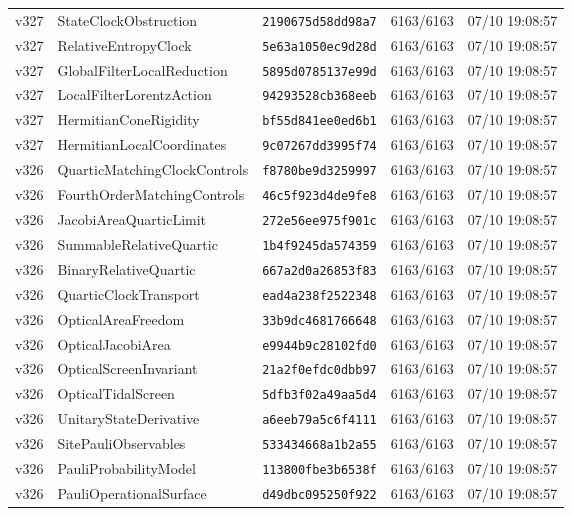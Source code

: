 \documentclass[11pt]{article}
\theoremstyle{definition}\newtheorem{deriv}{Derivation}
\begin{document}
{\begin{longtable}{@{}lllll@{}}
v327 & StateClockObstruction & \texttt{2190675d58dd98a7} & 6163/6163 & 07/10 19:08:57 \\
v327 & RelativeEntropyClock & \texttt{5e63a1050ec9d28d} & 6163/6163 & 07/10 19:08:57 \\
v327 & GlobalFilterLocalReduction & \texttt{5895d0785137e99d} & 6163/6163 & 07/10 19:08:57 \\
v327 & LocalFilterLorentzAction & \texttt{94293528cb368eeb} & 6163/6163 & 07/10 19:08:57 \\
v327 & HermitianConeRigidity & \texttt{bf55d841ee0ed6b1} & 6163/6163 & 07/10 19:08:57 \\
v327 & HermitianLocalCoordinates & \texttt{9c07267dd3995f74} & 6163/6163 & 07/10 19:08:57 \\
v326 & QuarticMatchingClockControls & \texttt{f8780be9d3259997} & 6163/6163 & 07/10 19:08:57 \\
v326 & FourthOrderMatchingControls & \texttt{46c5f923d4de9fe8} & 6163/6163 & 07/10 19:08:57 \\
v326 & JacobiAreaQuarticLimit & \texttt{272e56ee975f901c} & 6163/6163 & 07/10 19:08:57 \\
v326 & SummableRelativeQuartic & \texttt{1b4f9245da574359} & 6163/6163 & 07/10 19:08:57 \\
v326 & BinaryRelativeQuartic & \texttt{667a2d0a26853f83} & 6163/6163 & 07/10 19:08:57 \\
v326 & QuarticClockTransport & \texttt{ead4a238f2522348} & 6163/6163 & 07/10 19:08:57 \\
v326 & OpticalAreaFreedom & \texttt{33b9dc4681766648} & 6163/6163 & 07/10 19:08:57 \\
v326 & OpticalJacobiArea & \texttt{e9944b9c28102fd0} & 6163/6163 & 07/10 19:08:57 \\
v326 & OpticalScreenInvariant & \texttt{21a2f0efdc0dbb97} & 6163/6163 & 07/10 19:08:57 \\
v326 & OpticalTidalScreen & \texttt{5dfb3f02a49aa5d4} & 6163/6163 & 07/10 19:08:57 \\
v326 & UnitaryStateDerivative & \texttt{a6eeb79a5c6f4111} & 6163/6163 & 07/10 19:08:57 \\
v326 & SitePauliObservables & \texttt{533434668a1b2a55} & 6163/6163 & 07/10 19:08:57 \\
v326 & PauliProbabilityModel & \texttt{113800fbe3b6538f} & 6163/6163 & 07/10 19:08:57 \\
v326 & PauliOperationalSurface & \texttt{d49dbc095250f922} & 6163/6163 & 07/10 19:08:57 \\

\end{longtable}}
\end{document}
